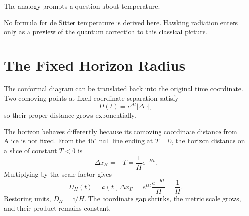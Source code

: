 The analogy prompts a question about temperature.

\begin{classroomqa}
\end{classroomqa}

No formula for de Sitter temperature is derived here. Hawking radiation enters only as a preview of the quantum correction to this classical picture.

\section{The Fixed Horizon Radius}

The conformal diagram can be translated back into the original time coordinate. Two comoving points at fixed coordinate separation satisfy
\begin{equation}
D(t)=e^{Ht}\lvert\Delta x\rvert,
\end{equation}
so their proper distance grows exponentially.

\begin{classroomqa}
\end{classroomqa}

The horizon behaves differently because its comoving coordinate distance from Alice is not fixed. From the \(45^\circ\) null line ending at \(T=0\), the horizon distance on a slice of constant \(T<0\) is
\begin{equation}
\Delta x_H=-T=\frac{1}{H}e^{-Ht}.
\label{eq:l08-coordinate-horizon}
\end{equation}
Multiplying by the scale factor gives
\begin{equation}
D_H(t)=a(t)\Delta x_H
=e^{Ht}\frac{e^{-Ht}}{H}
=\frac{1}{H}.
\label{eq:l08-fixed-horizon}
\end{equation}
Restoring units, \(D_H=c/H\). The coordinate gap shrinks, the metric scale grows, and their product remains constant.

